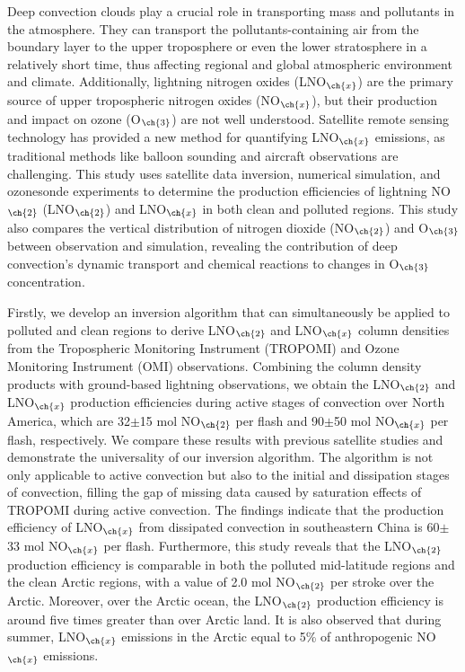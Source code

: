 {
Deep convection clouds play a crucial role in transporting mass and pollutants in the atmosphere.
They can transport the pollutants-containing air from the boundary layer to the upper troposphere or even the lower stratosphere in a relatively short time, thus affecting regional and global atmospheric environment and climate.
Additionally, lightning nitrogen oxides (LNO$_{\ch{x}}$) are the primary source of upper tropospheric nitrogen oxides (NO$_{\ch{x}}$),
but their production and impact on ozone (O$_{\ch{3}}$) are not well understood.
Satellite remote sensing technology has provided a new method for quantifying LNO$_{\ch{x}}$ emissions, as traditional methods like balloon sounding and aircraft observations are challenging.
This study uses satellite data inversion, numerical simulation, and ozonesonde experiments to determine the production efficiencies of lightning NO$_{\ch{2}}$ (LNO$_{\ch{2}}$) and LNO$_{\ch{x}}$ in both clean and polluted regions.
This study also compares the vertical distribution of nitrogen dioxide (NO$_{\ch{2}}$) and O$_{\ch{3}}$ between observation and simulation,  revealing the contribution of deep convection's dynamic transport and chemical reactions to changes in O$_{\ch{3}}$ concentration.

Firstly, we develop an inversion algorithm that can simultaneously be applied to polluted and clean regions to derive LNO$_{\ch{2}}$ and LNO$_{\ch{x}}$ column densities from the Tropospheric Monitoring Instrument (TROPOMI) and Ozone Monitoring Instrument (OMI) observations.
Combining the column density products with ground-based lightning observations, we obtain the LNO$_{\ch{2}}$ and LNO$_{\ch{x}}$ production efficiencies during active stages of convection over North America, which are 32$\pm$15 mol NO$_{\ch{2}}$ per flash and 90$\pm$50 mol NO$_{\ch{x}}$ per flash, respectively.
We compare these results with previous satellite studies and demonstrate the universality of our inversion algorithm.
The algorithm is not only applicable to active convection but also to the initial and dissipation stages of convection, filling the gap of missing data caused by saturation effects of TROPOMI during active convection.
The findings indicate that the production efficiency of LNO$_{\ch{x}}$ from dissipated convection in southeastern China is 60$\pm$33 mol NO$_{\ch{x}}$ per flash.
Furthermore, this study reveals that the LNO$_{\ch{2}}$ production efficiency is comparable in both the polluted mid-latitude regions and the clean Arctic regions, with a value of 2.0 mol NO$_{\ch{2}}$ per stroke over the Arctic.
Moreover, over the Arctic ocean, the LNO$_{\ch{2}}$ production efficiency is around five times greater than over Arctic land.
It is also observed that during summer, LNO$_{\ch{x}}$ emissions in the Arctic equal to 5\% of anthropogenic NO$_{\ch{x}}$ emissions.

}
